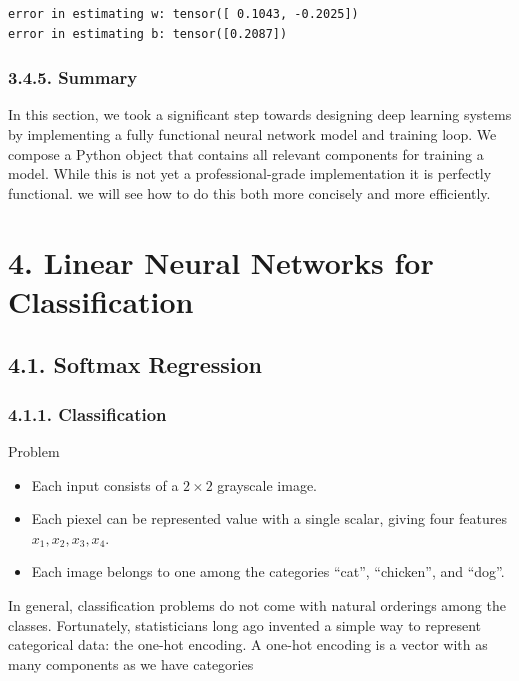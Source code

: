 \documentclass[11pt]{article}
\providecommand{\tightlist}{%
      \setlength{\itemsep}{0pt}\setlength{\parskip}{0pt}}
\begin{document}
    \begin{Verbatim}[commandchars=\\\{\}]
error in estimating w: tensor([ 0.1043, -0.2025])
error in estimating b: tensor([0.2087])
    \end{Verbatim}

    \subsubsection*{3.4.5. Summary}\label{summary}

    In this section, we took a significant step towards designing deep
learning systems by implementing a fully functional neural network model
and training loop. We compose a Python object that contains all relevant
components for training a model. While this is not yet a
professional-grade implementation it is perfectly functional. we will
see how to do this both more concisely and more efficiently.

    \section*{4. Linear Neural Networks for
Classification}\label{linear-neural-networks-for-classification}

    \subsection*{4.1. Softmax Regression}\label{softmax-regression}

    \subsubsection*{4.1.1. Classification}\label{classification}

    Problem
    \begin{itemize}
        \tightlist
        \item Each input consists of a \(2 \times 2\) grayscale image.
        \item Each piexel can be represented value with a single scalar, giving four features \(x_1, x_2, x_3, x_4\).
        \item Each image belongs to one among the categories ``cat'', ``chicken'', and ``dog''.
    \end{itemize}

    In general, classification problems do not come with natural orderings
among the classes. Fortunately, statisticians long ago invented a simple
way to represent categorical data: the one-hot encoding. A one-hot
encoding is a vector with as many components as we have categories
\end{document}
